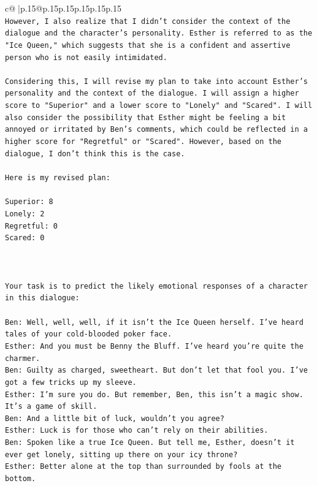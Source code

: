 \documentclass{article}
\begin{document}
{\begin{supertabular}{c@{$\;$}|p{.15\linewidth}@{}p{.15\linewidth}p{.15\linewidth}p{.15\linewidth}p{.15\linewidth}p{.15\linewidth}}
{{{\\ 
\texttt{However, I also realize that I didn't consider the context of the dialogue and the character's personality. Esther is referred to as the "Ice Queen," which suggests that she is a confident and assertive person who is not easily intimidated. } \\
\\ 
\texttt{Considering this, I will revise my plan to take into account Esther's personality and the context of the dialogue. I will assign a higher score to "Superior" and a lower score to "Lonely" and "Scared". I will also consider the possibility that Esther might be feeling a bit annoyed or irritated by Ben's comments, which could be reflected in a higher score for "Regretful" or "Scared". However, based on the dialogue, I don't think this is the case.} \\
\\ 
\texttt{Here is my revised plan:} \\
\\ 
\texttt{Superior: 8} \\
\texttt{Lonely: 2} \\
\texttt{Regretful: 0} \\
\texttt{Scared: 0} \\
\\ 
\\ 
\\ 
\texttt{Your task is to predict the likely emotional responses of a character in this dialogue:} \\
\\ 
\texttt{Ben: Well, well, well, if it isn't the Ice Queen herself. I've heard tales of your cold{-}blooded poker face.} \\
\texttt{Esther: And you must be Benny the Bluff. I've heard you're quite the charmer. } \\
\texttt{Ben: Guilty as charged, sweetheart. But don't let that fool you. I've got a few tricks up my sleeve.} \\
\texttt{Esther: I'm sure you do. But remember, Ben, this isn't a magic show. It's a game of skill. } \\
\texttt{Ben: And a little bit of luck, wouldn't you agree?} \\
\texttt{Esther: Luck is for those who can't rely on their abilities.} \\
\texttt{Ben: Spoken like a true Ice Queen. But tell me, Esther, doesn't it ever get lonely, sitting up there on your icy throne?} \\
\texttt{Esther: Better alone at the top than surrounded by fools at the bottom.} \\
}}}
\end{supertabular}}
\end{document}
